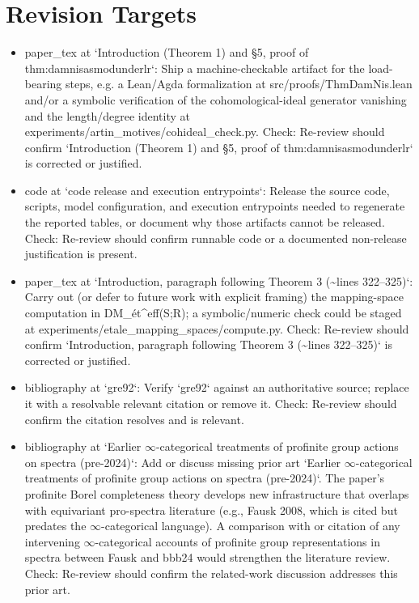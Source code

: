 \documentclass[11pt]{article}
\begin{document}
\section*{Revision Targets}
\begin{itemize}[leftmargin=*]
  \item [open] paper\_tex at `Introduction (Theorem 1) and §5, proof of thm:damnisasmodunderlr`: Ship a machine-checkable artifact for the load-bearing steps, e.g. a Lean/Agda formalization at src/proofs/ThmDamNis.lean and/or a symbolic verification of the cohomological-ideal generator vanishing and the length/degree identity at experiments/artin\_motives/cohideal\_check.py. Check: Re-review should confirm `Introduction (Theorem 1) and §5, proof of thm:damnisasmodunderlr` is corrected or justified.
  \item [open] code at `code release and execution entrypoints`: Release the source code, scripts, model configuration, and execution entrypoints needed to regenerate the reported tables, or document why those artifacts cannot be released. Check: Re-review should confirm runnable code or a documented non-release justification is present.
  \item [open] paper\_tex at `Introduction, paragraph following Theorem 3 (\~{}lines 322--325)`: Carry out (or defer to future work with explicit framing) the mapping-space computation in DM\_ét\^{}eff(S;R); a symbolic/numeric check could be staged at experiments/etale\_mapping\_spaces/compute.py. Check: Re-review should confirm `Introduction, paragraph following Theorem 3 (\~{}lines 322--325)` is corrected or justified.
  \item [open] bibliography at `gre92`: Verify `gre92` against an authoritative source; replace it with a resolvable relevant citation or remove it. Check: Re-review should confirm the citation resolves and is relevant.
  \item [open] bibliography at `Earlier \ensuremath{\infty}-categorical treatments of profinite group actions on spectra (pre-2024)`: Add or discuss missing prior art `Earlier \ensuremath{\infty}-categorical treatments of profinite group actions on spectra (pre-2024)`. The paper's profinite Borel completeness theory develops new infrastructure that overlaps with equivariant pro-spectra literature (e.g., Fausk 2008, which is cited but predates the \ensuremath{\infty}-categorical language). A comparison with or citation of any intervening \ensuremath{\infty}-categorical accounts of profinite group representations in spectra between Fausk and bbb24 would strengthen the literature review. Check: Re-review should confirm the related-work discussion addresses this prior art.
\end{itemize}
\end{document}
